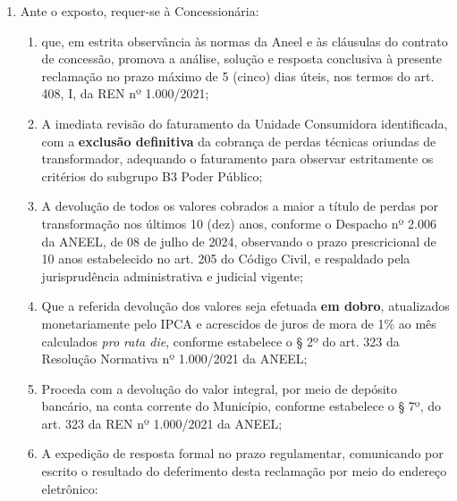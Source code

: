 \begin{enumerate}[resume]
\item Ante o exposto, requer-se à Concessionária:
    \begin{enumerate}
    \item que, em estrita observância às normas da Aneel e às cláusulas do contrato de concessão, promova a análise, solução e resposta conclusiva à presente reclamação no prazo máximo de 5 (cinco) dias úteis, nos termos do art. 408, I, da REN nº 1.000/2021;
    \item A imediata revisão do faturamento da Unidade Consumidora identificada, com a \textbf{exclusão definitiva} da cobrança de perdas técnicas oriundas de transformador, adequando o faturamento para observar estritamente os critérios do subgrupo B3 Poder Público;
    \item A devolução de todos os valores cobrados a maior a título de perdas por transformação nos últimos 10 (dez) anos, conforme o Despacho nº 2.006 da ANEEL, de 08 de julho de 2024, observando o prazo prescricional de 10 anos estabelecido no art. 205 do Código Civil, e respaldado pela jurisprudência administrativa e judicial vigente;
    \item Que a referida devolução dos valores seja efetuada \textbf{em dobro}, atualizados monetariamente pelo IPCA e acrescidos de juros de mora de 1\% ao mês calculados \textit{pro rata die}, conforme estabelece o § 2º do art. 323 da Resolução Normativa nº 1.000/2021 da ANEEL;
    \item Proceda com a devolução do valor integral, por meio de depósito bancário, na conta corrente do Município, conforme estabelece o § 7º, do art. 323 da REN nº 1.000/2021 da ANEEL;
    \item A expedição de resposta formal no prazo regulamentar, comunicando por escrito o resultado do deferimento desta reclamação por meio do endereço eletrônico: \emailEmpresa{}
    \end{enumerate}
\end{enumerate}